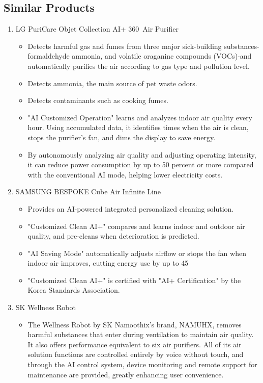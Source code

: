 \documentclass[conference]{IEEEtran}
\begin{document}
    \subsection{Similar Products}
        \begin{enumerate}
            \item LG PuriCare Objet Collection AI+ 360\textdegree\ Air Purifier
                \begin{itemize}
                    \item Detects harmful gas and fumes from three major sick-building substances-formaldehyde ammonia, and volatile oraganinc compounds (VOCs)-and automatically purifies the air according to gas type and pollution level.
                    \item Detects ammonia, the main source of pet waste odors.
                    \item Detects contaminants such as cooking fumes.
                    \item "AI Customized Operation" learns and analyzes indoor air quality every hour. Using accumulated data, it identifies times when the air is clean, stops the purifier's fan, and dims the display to save energy.
                    \item By autonomously analyzing air quality and adjusting operating intensity, it can reduce power consumption by up to 50 percent or more compared with the conventional AI mode, helping lower electricity costs.
                \end{itemize}
            \item SAMSUNG BESPOKE Cube Air Infinite Line
                \begin{itemize}
                    \item Provides an AI-powered integrated personalized cleaning solution.
                    \item "Customized Clean AI+" compares and learns indoor and outdoor air quality, and pre-cleans when deterioration is predicted.
                    \item "AI Saving Mode" automatically adjusts airflow or stops the fan when indoor air improves, cutting energy use by up to 45%
                    \item "Customized Clean AI+" is certified with "AI+ Certification" by the Korea Standards Association.
                \end{itemize}
            \item SK Wellness Robot
                \begin{itemize}
                    \item The Wellness Robot by SK Namoothix's brand, NAMUHX, removes harmful substances that enter during ventilation to maintain air quality. It also offers performance equivalent to six air purifiers. All of its air solution functions are controlled entirely by voice without touch, and through the AI control system, device monitoring and remote support for maintenance are provided, greatly enhancing user convenience.
                \end{itemize}
        \end{enumerate}
        
\end{document}
